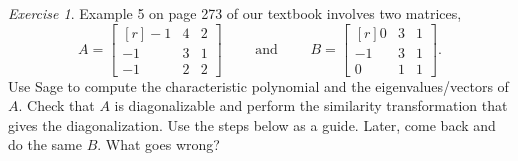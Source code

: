 \documentclass[fleqn,11pt]{paper}
\theoremstyle{remark}
\newtheorem{exercise}{Exercise}
\newcommand{\<}{\ensuremath{\langle}}
\renewcommand{\>}{\ensuremath{\rangle}}
\begin{document}
\begin{exercise}
Example 5 on page 273 of our textbook involves two matrices,
\[
A =\begin{bmatrix*}[r]-1&4&2\\-1&3 &1\\-1&2 &2\end{bmatrix*} \qquad \text{ and } \qquad
B =\begin{bmatrix*}[r]0&3&1\\-1&3 &1\\0&1 &1\end{bmatrix*}.
\]
Use Sage to compute the characteristic polynomial and the eigenvalues/vectors of 
$A$. Check that $A$ is diagonalizable and 
perform the similarity transformation that gives the diagonalization. 
Use the steps below as a guide. Later, come back and do the same $B$. What goes wrong?


\end{exercise}
\end{document}
